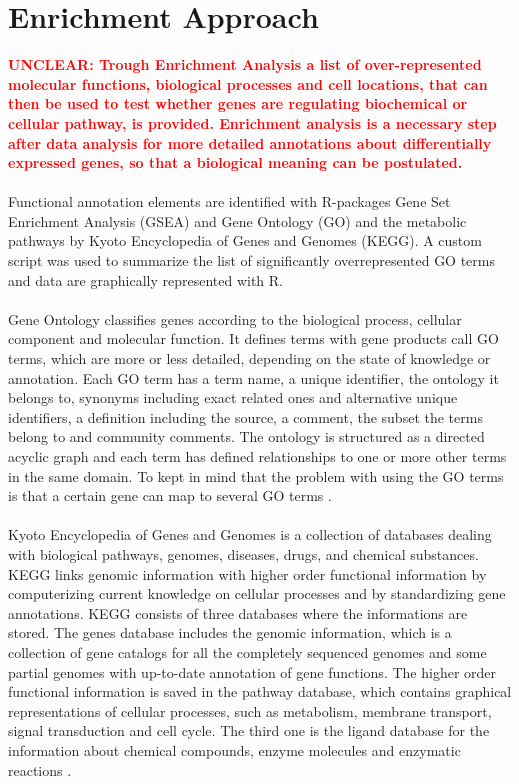 \documentclass[12pt, a4paper]{report}
\newcommand{\HT}[1]{\textcolor{red}\textbf{#1}}
\begin{document}
\section{Enrichment Approach}
\HT{UNCLEAR: Trough Enrichment Analysis a list of over-represented molecular functions, biological processes and cell locations, that can then be used to test whether genes are regulating biochemical or cellular pathway, is provided. Enrichment analysis is a necessary step after data analysis for more detailed annotations about differentially expressed genes, so that a biological meaning can be postulated. \\} 
\ \\
Functional annotation elements are identified with R-packages Gene Set Enrichment Analysis (GSEA) \cite{Subramanian2005} and Gene Ontology (GO) and the metabolic pathways by Kyoto Encyclopedia of Genes and Genomes (KEGG). 
A custom script was used to summarize the list of significantly overrepresented GO terms and data are graphically represented with R. \\
\ \\
Gene Ontology classifies genes according to the biological process, cellular component and molecular function. It defines terms with gene products call GO terms, which are more or less detailed, depending on the state of knowledge or annotation. 
Each GO term has a term name, a unique identifier, the ontology it belongs to, synonyms including exact related ones and alternative unique identifiers, a definition including the source, a comment, the subset the terms belong to and community comments. The ontology is structured as a directed acyclic graph and each term has defined relationships to one or more other terms in the same domain. To kept in mind that the problem with using the GO terms is that a certain gene can map to several GO terms \cite{Ashburner2000}. \\
\ \\
Kyoto Encyclopedia of Genes and Genomes is a collection of databases dealing with biological pathways, genomes, diseases, drugs, and chemical substances. KEGG links genomic information with higher order functional information by computerizing current knowledge on cellular processes and by standardizing gene annotations. KEGG consists of three databases where the informations are stored. The genes database includes the genomic information, which is a collection of gene catalogs for all the completely sequenced genomes and some partial genomes with up-to-date annotation of gene functions. The higher order functional information is saved in the pathway database, which contains graphical representations of cellular processes, such as metabolism, membrane transport, signal transduction and cell cycle. The third one is the ligand database for the information about chemical compounds, enzyme molecules and enzymatic reactions \cite{kanehisa2000}. 
\end{document}
